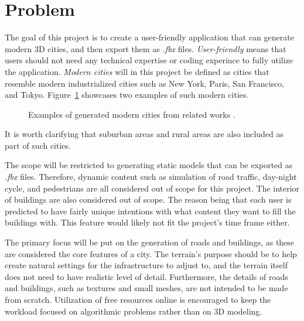 \newpage
\section{Problem}

The goal of this project is to create a user-friendly application that can generate modern 3D cities, and then export them as \textit{.fbx} files.
\textit{User-friendly} means that users should not need any technical expertise or coding experince to fully utilize the application.
\textit{Modern cities} will in this project be defined as cities that resemble
modern industrialized cities such as New York, Paris, San Francisco, and Tokyo.
Figure~\ref{fig:ModernCities} showcases two examples of such modern cities.

\begin{figure}[h!]
  \centering

  \begin{subfigure}[b]{0.48\textwidth}
  \end{subfigure}
  \quad
  \begin{subfigure}[b]{0.48\textwidth}
  \end{subfigure}

  \caption{Examples of generated modern cities from related works \cite{yoav_and_pascal}\cite{cl3ver}.}
  \label{fig:ModernCities}
\end{figure}

It is worth clarifying that suburban areas and rural areas are also included as
part of such cities.

The scope will be restricted to generating static models that can be exported as \textit{.fbx} files.
Therefore, dynamic content such as simulation of road traffic, day-night cycle,
and pedestrians are all considered out of scope for this project.
The interior of buildings are also considered out of scope.
The reason being that each user is predicted to have fairly unique intentions with 
what content they want to fill the buildings with. This feature would likely not
fit the project's time frame either.

The primary focus will be put on the generation of roads and buildings, as these
are considered the core features of a city.
The terrain's purpose should be to help create natural
settings for the infrastructure to adjust to, and the terrain itself does not need
to have realistic level of detail. Furthermore, the details of roads and
buildings, such as textures and small meshes, are not intended to be made from
scratch. Utilization of free resources online is encouraged to keep the workload
focused on algorithmic problems rather than on 3D modeling.

